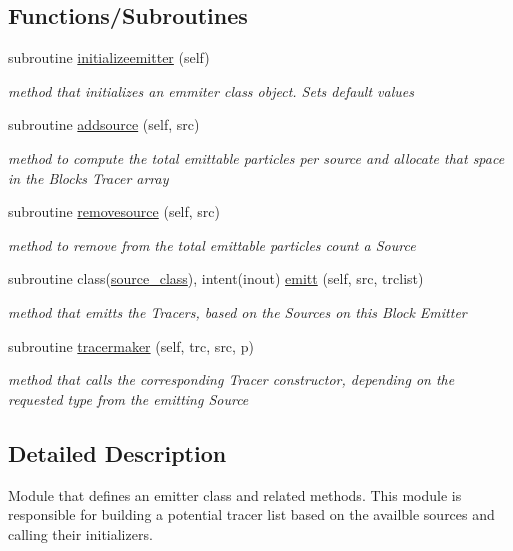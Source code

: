 \subsection*{Functions/\+Subroutines}
\begin{DoxyCompactItemize}
\item 
subroutine \mbox{\hyperlink{namespaceemitter__mod_a6376ad0f8e1739b29caf672aa0750373}{initializeemitter}} (self)
\begin{DoxyCompactList}\small\item\em method that initializes an emmiter class object. Sets default values \end{DoxyCompactList}\item 
subroutine \mbox{\hyperlink{namespaceemitter__mod_ab704fb0e2eb9b3b4b9542706b6fb4eaf}{addsource}} (self, src)
\begin{DoxyCompactList}\small\item\em method to compute the total emittable particles per source and allocate that space in the Blocks Tracer array \end{DoxyCompactList}\item 
subroutine \mbox{\hyperlink{namespaceemitter__mod_a49b704640270da1c4fad50fcd5374376}{removesource}} (self, src)
\begin{DoxyCompactList}\small\item\em method to remove from the total emittable particles count a Source \end{DoxyCompactList}\item 
subroutine class(\mbox{\hyperlink{structsources__mod_1_1source__class}{source\+\_\+class}}), intent(inout) \mbox{\hyperlink{namespaceemitter__mod_ae620ebb6a0515272d2f3aa12a88e983a}{emitt}} (self, src, trclist)
\begin{DoxyCompactList}\small\item\em method that emitts the Tracers, based on the Sources on this Block Emitter \end{DoxyCompactList}\item 
subroutine \mbox{\hyperlink{namespaceemitter__mod_aee7b24637d2249727bccab333e062516}{tracermaker}} (self, trc, src, p)
\begin{DoxyCompactList}\small\item\em method that calls the corresponding Tracer constructor, depending on the requested type from the emitting Source \end{DoxyCompactList}\end{DoxyCompactItemize}


\subsection{Detailed Description}
Module that defines an emitter class and related methods. This module is responsible for building a potential tracer list based on the availble sources and calling their initializers. 

